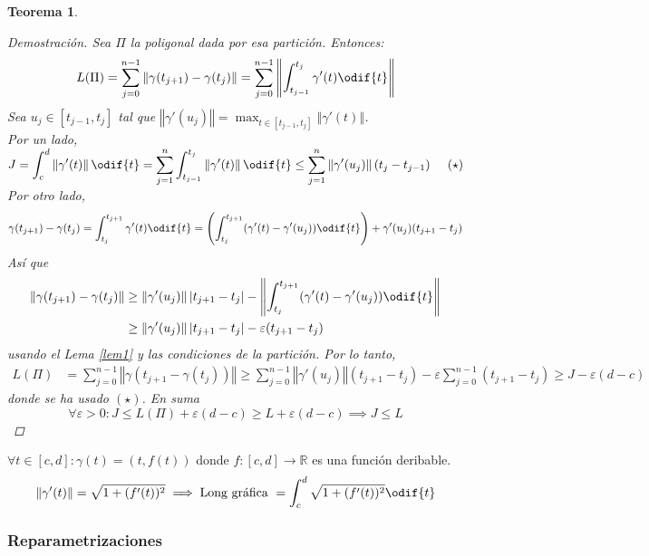\documentclass[12pt]{article}
\theoremstyle{plain}
\newtheorem{teo}{Teorema}[subsection]
\newenvironment{dem}[1][]{%
	\begin{adjustwidth}{1cm}{0cm} \begin{proof}[Demostración\ifx\relax#1\relax\else{ (#1)}\fi]
}{\end{proof}\end{adjustwidth}}
\newcommand{\R}{\mathbb{R}}
\newcommand{\norm}[1]{\left\Vert#1\right\Vert}
\newcommand{\appl}[3]{#1 \colon #2 \longrightarrow #3}
\newcommand{\ds}{\displaystyle}
\newcommand{\tex}[1]{\text{#1}}
\renewcommand{\norm}[1]{\left\Vert#1\right\Vert}
\begin{document}
\begin{teo}
\begin{dem}
		Sea $\Pi$ la poligonal dada por esa partición. Entonces:
		\[L(\Pi)=\sum_{j=0}^{n-1}\norm{\gamma(t_{j+1})-\gamma(t_j)}=\sum_{j=0}^{n-1}\norm{\int_{t_{j-1}}^{t_j}\gamma'(t)\odif{t}}\]
		Sea $\ds u_j\in \left[t_{j-1}, t_j\right]$ tal que $\ds\norm{\gamma'(u_j)}=\max_{t\in \left[t_{j-1}, t_j\right]}\norm{\gamma'(t)}$. \\
		Por un lado, $\ds J=\int_c^d\norm{\gamma'(t)}\odif{t} = \sum_{j=1}^n \int_{t_{j-1}}^{t_j}\norm{\gamma'(t)}\odif{t} \leq \sum_{j=1}^n\norm{\gamma'(u_j)}(t_j-t_{j-1}) \hspace{0.5cm} (\star)$ \\
		Por otro lado, \[\ds \gamma(t_{j+1})-\gamma(t_j) = \int_{t_j}^{t_{j+1}}\gamma'(t)\odif{t}=\left(\int_{t_j}^{t_{j+1}}(\gamma'(t)-\gamma'(u_j))\odif{t}\right)+\gamma'(u_j)(t_{j+1}-t_j)\]
		Así que \begin{equation*}
			\begin{split}
				\norm{\gamma(t_{j+1})-\gamma(t_j)} & \geq  \norm{\gamma'(u_j)}|t_{j+1}-t_j|-\norm{\int_{t_j}^{t_{j+1}}(\gamma'(t)-\gamma'(u_j))\odif{t}} \\ & \geq  \norm{\gamma'(u_j)}|t_{j+1}-t_j|-\varepsilon(t_{j+1}-t_j)
			\end{split}
		\end{equation*}
		usando el Lema \ref{lem1} y las condiciones de la partición.
		Por lo tanto, \begin{equation*}\begin{split}
			L(\Pi) &=\sum_{j=0}^{n-1}\norm{\gamma(t_{j+1}-\gamma(t_j))}
			\geq \sum_{j=0}^{n-1}\norm{\gamma'(u_j)}(t_{j+1}-t_j)-\varepsilon\sum_{j=0}^{n-1}(t_{j+1}-t_j) \geq J -\varepsilon(d-c)
		\end{split}\end{equation*}
		donde se ha usado $(\star)$. En suma
		\[\forall \varepsilon > 0 : J\leq L(\Pi) + \varepsilon(d-c)\geq L + \varepsilon(d-c) \implies J \leq L\]
	\end{dem}
\end{teo}
\begin{ejem} 
	$\ds \forall t \in \left[c, d\right] : \gamma(t)=(t, f(t))$ donde $\appl{f}{\left[c, d\right]}{\R}$ es una función deribable.
	\[ \norm{\gamma'(t)}=\sqrt{1+(f'(t))^2} \implies \tex{Long gráfica }=\int_c^d \sqrt{1+(f'(t))^2} \odif{t}\]
\end{ejem}



\subsubsection{Reparametrizaciones}
\end{document}
